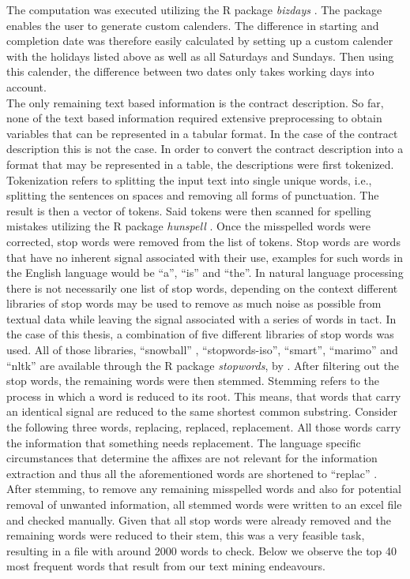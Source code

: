 \documentclass[a4paper,12pt, headsepline]{scrartcl}
\numberwithin{equation}{section}
\begin{document}
 The computation was executed utilizing the R package \textit{bizdays} \citep{bizdays}. The package enables the user to generate custom calenders. The difference in starting and completion date was therefore easily calculated by setting up a custom calender with the holidays listed above as well as all Saturdays and Sundays. Then using this calender, the difference between two dates only takes working days into account.\\
 The only remaining text based information is the contract description. So far, none of the text based information required extensive preprocessing to obtain variables that can be represented in a tabular format. In the case of the contract description this is not the case. In order to convert the contract description into a format that may be represented in a table, the descriptions were first tokenized. Tokenization refers to splitting the input text into single unique words, i.e., splitting the sentences on spaces and removing all forms of punctuation. The result is then a vector of tokens. Said tokens were then scanned for spelling mistakes utilizing the R package \textit{hunspell} \citep{hunspell}. Once the misspelled words were corrected, stop words were removed from the list of tokens. Stop words are words that have no inherent signal associated with their use, examples for such words in the English language would be \enquote{a}, \enquote{is} and \enquote{the}. In natural language processing there is not necessarily one list of stop words, depending on the context different libraries of stop words may be used to remove as much noise as possible from textual data while leaving the signal associated with a series of words in tact. In the case of this thesis, a combination of five different libraries of stop words was used. All of those libraries, \enquote{snowball} , \enquote{stopwords-iso}, 
 \enquote{smart}, \enquote{marimo} and \enquote{nltk} are available through the R package \textit{stopwords}, by \citet{stopwords}. After filtering out the stop words, the remaining words were then stemmed. Stemming refers to the process in which a word is reduced to its root. This means, that words that carry an identical signal are reduced to the same shortest common substring. Consider the following three words, replacing, replaced, replacement. All those words carry the information that something needs replacement. The language specific circumstances that determine the affixes are not relevant for the information extraction and thus all the aforementioned words are shortened to \enquote{replac} \citep{textminingR}. After stemming, to remove any remaining misspelled words and also for potential removal of unwanted information, all stemmed words were written to an excel file and checked manually. Given that all stop words were already removed and the remaining words were reduced to their stem, this was a very feasible task, resulting in a file with around 2000 words to check. Below we observe the top 40 most frequent words that result from our text mining endeavours.
 
\end{document}
